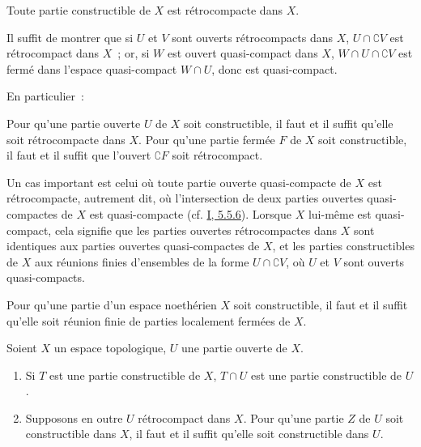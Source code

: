 \begin{corollary}[9.1.4]
\label{0.9.1.4-fr}
Toute partie constructible de $X$ est rétrocompacte dans $X$.
\end{corollary}

Il suffit de montrer que si $U$ et $V$ sont ouverts rétrocompacts dans $X$,
$U\cap\complement{V}$ est rétrocompact dans $X$~; or, si $W$ est ouvert
quasi-compact dans $X$, $W\cap U\cap\complement{V}$ est fermé dans l'espace
quasi-compact $W\cap U$, donc est quasi-compact.

En particulier~:

\begin{corollary}[9.1.5]
\label{0.9.1.5-fr}
Pour qu'une partie ouverte $U$ de $X$ soit constructible, il faut et il
suffit qu'elle soit rétrocompacte dans $X$. Pour qu'une partie fermée $F$ de
$X$ soit constructible, il faut et il suffit que l'ouvert $\complement{F}$
soit rétrocompact.
\end{corollary}

\begin{env}[9.1.6]
\label{0.9.1.6-fr}
Un cas important est celui où toute partie ouverte quasi-compacte de $X$ est
rétrocompacte, autrement dit, où l'intersection de deux parties ouvertes
quasi-compactes de $X$ est quasi-compacte
(cf. \hyperref[I.5.5.6-fr]{I, 5.5.6}). Lorsque $X$ lui-même est
quasi-compact, cela signifie que les parties ouvertes rétrocompactes dans
$X$ sont identiques aux parties ouvertes quasi-compactes de $X$, et les
parties constructibles de $X$ aux réunions finies d'ensembles de la forme
$U\cap\complement{V}$, où $U$ et $V$ sont ouverts quasi-compacts.
\end{env}

\begin{corollary}[9.1.7]
\label{0.9.1.7-fr}
Pour qu'une partie d'un espace noethérien $X$ soit constructible, il faut et
il suffit qu'elle soit réunion finie de parties localement fermées de $X$.
\end{corollary}

\begin{proposition}[9.1.8]
\label{0.9.1.8-fr}
Soient $X$ un espace topologique, $U$ une partie ouverte de $X$.
\begin{enumerate}
  \item[(i)] Si $T$ est une partie constructible de $X$, $T\cap U$ est une
    partie constructible de $U$.
  \item[(ii)] Supposons en outre $U$ rétrocompact dans $X$. Pour qu'une
    partie $Z$ de $U$ soit constructible dans $X$, il faut et il suffit
    qu'elle soit constructible dans $U$.
\end{enumerate}
\end{proposition}

